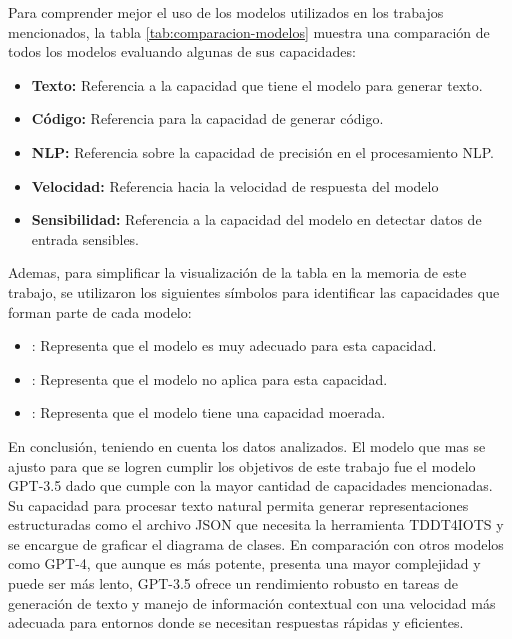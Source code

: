 Para comprender mejor el uso de los modelos utilizados en los trabajos mencionados, la tabla \ref{tab:comparacion-modelos} muestra una comparación de todos los modelos evaluando algunas de sus capacidades:

\begin{itemize}
	\item \textbf{Texto:} Referencia a la capacidad que tiene el modelo para generar texto.
	\item \textbf{Código:} Referencia para la capacidad de generar código.
	\item \textbf{NLP:} Referencia sobre la capacidad de precisión en el procesamiento NLP.
	\item \textbf{Velocidad:} Referencia hacia la velocidad de respuesta del modelo
	\item \textbf{Sensibilidad:} Referencia a la capacidad del modelo en detectar datos de entrada sensibles.
\end{itemize}

Ademas, para simplificar la visualización de la tabla en la memoria de este trabajo, se utilizaron los siguientes símbolos para identificar las capacidades que forman parte de cada modelo:

\begin{itemize}
	\item {}: Representa que el modelo es muy adecuado para esta capacidad. 
	\item {}: Representa que el modelo no aplica para esta capacidad.
	\item \faMinus: Representa que el modelo tiene una capacidad moerada.
\end{itemize}



En conclusión, teniendo en cuenta los datos analizados. El modelo que mas se ajusto para que se logren cumplir los objetivos de este trabajo fue el modelo GPT-3.5 dado que cumple con la mayor cantidad de capacidades mencionadas. Su capacidad para procesar texto natural permita generar representaciones estructuradas como el archivo JSON que necesita  la herramienta TDDT4IOTS y se encargue de graficar el diagrama de clases. En comparación con otros modelos como GPT-4, que aunque es más potente, presenta una mayor complejidad y puede ser más lento, GPT-3.5 ofrece un rendimiento robusto en tareas de generación de texto y manejo de información contextual con una velocidad más adecuada para entornos donde se necesitan respuestas rápidas y eficientes.

